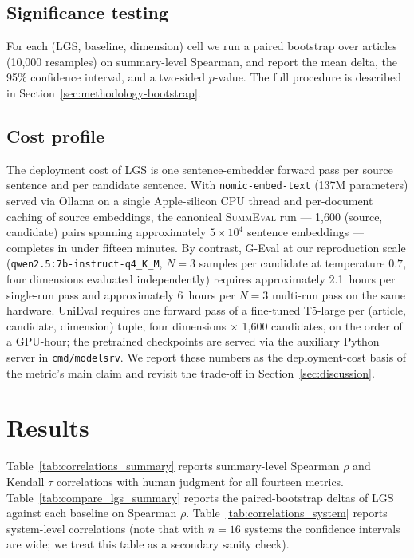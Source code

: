 \documentclass[journal]{IEEEtran}
\begin{document}
\subsection{Significance testing}
For each (LGS, baseline, dimension) cell we run a paired bootstrap
over articles (10{,}000 resamples) on summary-level Spearman, and
report the mean delta, the 95\% confidence interval, and a two-sided
$p$-value. The full procedure is described in
Section~\ref{sec:methodology-bootstrap}.

\subsection{Cost profile}
\label{sec:setup-cost}
The deployment cost of LGS is one sentence-embedder forward pass
per source sentence and per candidate sentence. With
\texttt{nomic-embed-text} (137M parameters) served via Ollama on a
single Apple-silicon CPU thread and per-document caching of source
embeddings, the canonical \textsc{SummEval} run --- 1{,}600
(source, candidate) pairs spanning approximately $5\times10^4$
sentence embeddings --- completes in under fifteen minutes. By
contrast, G-Eval at our reproduction scale (\texttt{qwen2.5:7b-instruct-q4\_K\_M},
$N{=}3$ samples per candidate at temperature $0.7$, four
dimensions evaluated independently) requires approximately
2.1~hours per single-run pass and approximately 6~hours per
$N{=}3$ multi-run pass on the same hardware. UniEval requires one
forward pass of a fine-tuned T5-large per
(article, candidate, dimension) tuple, four dimensions $\times$
1{,}600 candidates, on the order of a GPU-hour; the pretrained
checkpoints are served via the auxiliary Python server in
\texttt{cmd/modelsrv}. We report these numbers as the
deployment-cost basis of the metric's main claim and revisit the
trade-off in Section~\ref{sec:discussion}.

\section{Results}
\label{sec:results}

Table~\ref{tab:correlations_summary} reports summary-level Spearman
$\rho$ and Kendall $\tau$ correlations with human judgment for all
fourteen metrics. Table~\ref{tab:compare_lgs_summary} reports the
paired-bootstrap deltas of LGS against each baseline on Spearman
$\rho$. Table~\ref{tab:correlations_system} reports system-level
correlations (note that with $n=16$ systems the confidence intervals
are wide; we treat this table as a secondary sanity check).
\end{document}
